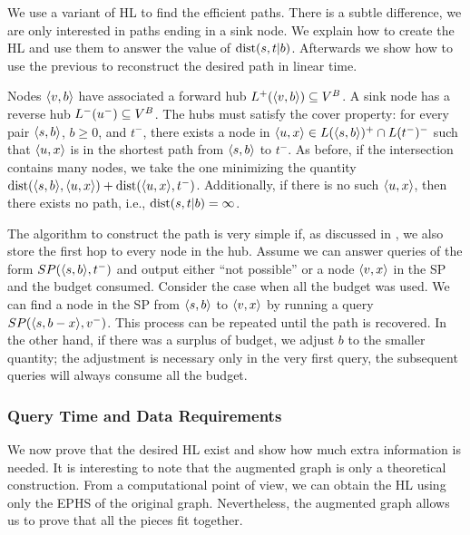We use a variant of HL to find the efficient paths.
There is a subtle difference, we are only interested in paths ending in a sink node.
We explain how to create the HL and use them to answer the value of $\text{dist}(s,t|b)$.
Afterwards we show how to use the previous to reconstruct the desired path in linear time.

Nodes $\langle v,b\rangle$ have associated a forward hub $L^+(\langle v,b\rangle)\subseteq V^B$.
A sink node has a reverse hub $L^-(u^-)\subseteq V^B$.
The hubs must satisfy the cover property: for every pair $\langle s,b\rangle$, $b\geq 0$, and $t^-$, there exists a node in $\langle u,x\rangle\in L(\langle s,b\rangle)^+\cap L(t^-)^-$ such that $\langle u,x\rangle$ is in the shortest path from $\langle s,b\rangle$ to $t^-$.
As before, if the intersection contains many nodes, we take the one minimizing the quantity $\text{dist}(\langle s,b\rangle,\langle u,x\rangle)+\text{dist}(\langle u,x\rangle,t^-)$.
Additionally, if there is no such $\langle u,x\rangle$, then there exists no path, i.e., $\text{dist}(s,t|b)=\infty$.

The algorithm to construct the path is very simple if, as discussed in , we also store the first hop to every node in the hub.
Assume we can answer queries of the form $SP(\langle s,b\rangle,t^-)$ and output either ``not possible'' or a node $\langle v,x\rangle$ in the SP and the budget consumed.
Consider the case when all the budget was used.
We can find a node in the SP from $\langle s,b\rangle$ to $\langle v,x\rangle$ by running a query $SP(\langle s,b-x\rangle,v^-)$.
This process can be repeated until the path is recovered.
In the other hand, if there was a surplus of budget, we adjust $b$ to the smaller quantity; the adjustment is necessary only in the very first query, the subsequent queries will always consume all the budget.

\subsubsection{Query Time and Data Requirements}
We now prove that the desired HL exist and show how much extra information is needed.
It is interesting to note that the augmented graph is only a theoretical construction.
From a computational point of view, we can obtain the HL using only the EPHS of the original graph.
Nevertheless, the augmented graph allows us to prove that all the pieces fit together.

